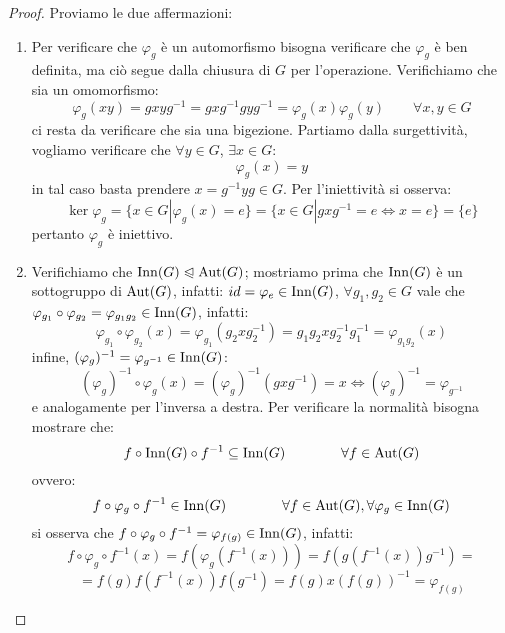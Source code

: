 \documentclass[11pt]{scrartcl}
\begin{document}
\begin{proof}
    Proviamo le due affermazioni:
        \begin{enumerate}[(1)]
            \item Per verificare che $\varphi_g$ è un automorfismo bisogna verificare che $\varphi_g$ è ben definita, ma ciò segue dalla chiusura di $G$ per l'operazione.
                Verifichiamo che sia un omomorfismo:
                    \[ \varphi_g(xy) = g x y g^{-1} = gxg^{-1}gyg^{-1} = \varphi_g(x)\varphi_g(y)
                    \qquad \forall x,y \in G 
                        \]
                ci resta da verificare che sia una bigezione. Partiamo dalla surgettività, vogliamo verificare che $\forall y \in G$, $\exists x \in G :$
                    \[ \varphi_g(x) = y
                        \]
                in tal caso basta prendere $x = g^{-1}yg \in G$. Per l'iniettività si osserva:
                    \[ \ker \varphi_g = \{x \in G | \varphi_g(x) = e\} = \{x \in G | gxg^{-1} = e \iff x = e\} = \{e\}
                        \]
                pertanto $\varphi_g$ è iniettivo.
            \item Verifichiamo che $\operatorname{Inn}(G) \trianglelefteqslant \operatorname{Aut}(G)$; mostriamo prima che $\operatorname{Inn}(G)$ è un sottogruppo di $\operatorname{Aut}(G)$, infatti: 
            $id = \varphi_e \in \operatorname{Inn}(G)$, $\forall g_1,g_2 \in G$ vale che $\varphi_{g_{1}} \circ \varphi_{g_{2}} = \varphi_{g_1g_2} \in \operatorname{Inn}(G)$, infatti:
                    \[ \varphi_{g_{1}} \circ \varphi_{g_{2}}(x) = \varphi_{g_{1}}(g_2xg_2^{-1}) = g_1g_2xg_2^{-1}g_1^{-1} = \varphi_{g_1g_2}(x)
                        \]
                infine, $(\varphi_{g})^{-1} = \varphi_{g^{-1}} \in \operatorname{Inn}(G)$:
                    \[ (\varphi_{g})^{-1} \circ \varphi_{g}(x) = (\varphi_{g})^{-1} (gxg^{-1}) = x \iff (\varphi_{g})^{-1} = \varphi_{g^{-1}}
                        \]
                e analogamente per l'inversa a destra. Per verificare la normalità bisogna mostrare che:
                    \[ f \circ \operatorname{Inn}(G) \circ f^{-1} \subseteq \operatorname{Inn}(G)
                    \qquad \qquad \forall f \in \operatorname{Aut}(G)
                        \]
                ovvero:
                    \[ f \circ \varphi_g \circ f^{-1} \in \operatorname{Inn}(G)
                    \qquad \qquad \forall f \in \operatorname{Aut}(G), \forall \varphi_g \in \operatorname{Inn}(G)
                        \]
                si osserva che $f \circ \varphi_g \circ f^{-1} = \varphi_{f(g)} \in \operatorname{Inn}(G)$, infatti:
                    \[ f \circ \varphi_g \circ f^{-1} (x) = f(\varphi_g(f^{-1} (x))) = f(g(f^{-1}(x))g^{-1}) =
                        \]\[ = f(g) f(f^{-1}(x)) f(g^{-1}) = f(g) x (f(g))^{-1} = \varphi_{f(g)}
                            \]
        \end{enumerate}
\end{proof}
\end{document}
